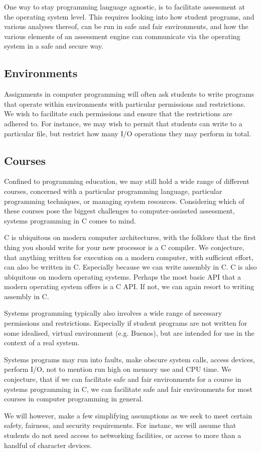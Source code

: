 One way to stay programming language agnostic, is to facilitate assessment at
the operating system level. This requires looking into how student programs,
and various analyses thereof, can be run in safe and fair environments, and how
the various elements of an assessment engine can communicate via the operating
system in a safe and secure way.

\subsection{Environments}

Assignments in computer programming will often ask students to write programs
that operate within environments with particular permissions and restrictions.
We wish to facilitate such permissions and ensure that the restrictions are
adhered to. For instance, we may wish to permit that students can write to a
particular file, but restrict how many I/O operations they may perform in
total.

\subsection{Courses}

Confined to programming education, we may still hold a wide range of different
courses, concerned with a particular programming language, particular
programming techniques, or managing system resources. Considering which of
these courses pose the biggest challenges to computer-assissted assessment,
systems programming in C comes to mind.

C is ubiquitous on modern computer architectures, with the folklore that the
first thing you should write for your new processor is a C compiler. We
conjecture, that anything written for execution on a modern computer, with
sufficient effort, can also be written in C. Especially because we can write
assembly in C. C is also ubiquitous on modern operating systems. Perhaps the
most basic API that a modern operating system offers is a C API. If not, we can
again resort to writing assembly in C.

Systems programming typically also involves a wide range of necessary
permissions and restrictions. Especially if student programs are not written
for some idealised, virtual environment (e.g. Buenos), but are intended for use
in the context of a real system.

Systems programs may run into faults, make obscure system calls, access
devices, perform I/O, not to mention run high on memory use and CPU time. We
conjecture, that if we can facilitate safe and fair environments for a course
in systems programming in C, we can facilitate safe and fair environments for
most courses in computer programming in general.

We will however, make a few simplifying assumptions as we seek to meet certain
safety, fairness, and security requirements. For instanc, we will assume that
students do not need access to networking facilities, or access to more than a
handful of character devices.
